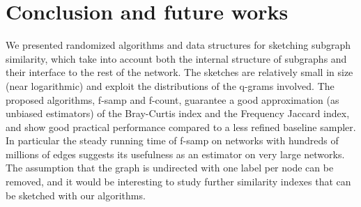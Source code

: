 \chapter{Conclusion and future works}
    

We presented randomized algorithms and data structures for sketching subgraph similarity, which take into account both the internal structure of subgraphs and their interface to the rest of the network. 
The sketches are relatively small in size (near logarithmic)
and exploit the distributions of the q-grams involved. The proposed
algorithms, f-samp and f-count, guarantee a good approximation
(as unbiased estimators) of the Bray-Curtis index and the Frequency
Jaccard index, and show good practical performance compared to a
less refined baseline sampler. In particular the steady running time
of f-samp on networks with hundreds of millions of edges suggests
its usefulness as an estimator on very large networks.
The assumption that the graph is undirected with one label per
node can be removed, and it would be interesting to study further
similarity indexes that can be sketched with our algorithms.